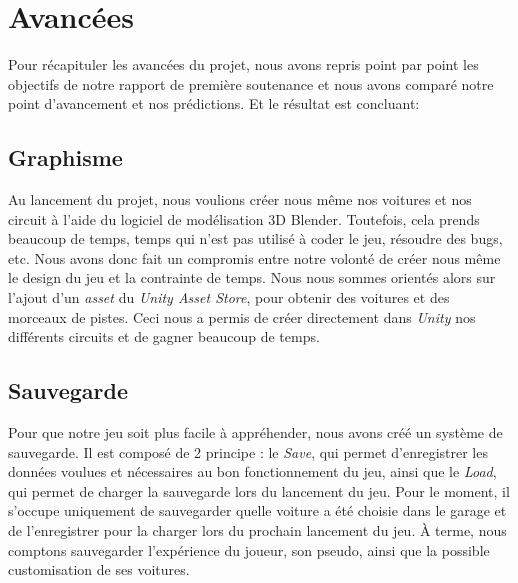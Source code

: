 \documentclass[12pt,a4paper]{article}
\begin{document}
    \section{Avancées}
        Pour récapituler les avancées du projet, nous avons repris point par point les objectifs de 
        notre rapport de première soutenance et nous avons comparé notre point d'avancement et nos 
        prédictions. Et le résultat est concluant:

        \subsection{Graphisme}
            Au lancement du projet, nous voulions créer nous même nos voitures et nos circuit à 
            l'aide du logiciel de modélisation 3D Blender. Toutefois, cela prends beaucoup de temps,
            temps qui n'est pas utilisé à coder le jeu, résoudre des bugs, etc. Nous avons donc fait
            un compromis entre notre volonté de créer nous même le design du jeu et la contrainte de
            temps. Nous nous sommes orientés alors sur l'ajout d'un \textit{asset} du \textsl{Unity
            Asset Store}, pour obtenir des voitures et des morceaux de pistes. Ceci nous a permis de
            créer directement dans \textsl{Unity} nos différents circuits et de gagner beaucoup de 
            temps. 
        
        \subsection{Sauvegarde}
            Pour que notre jeu soit plus facile à appréhender, nous avons créé un système de 
            sauvegarde. Il est composé de 2 principe : le \textsl{Save}, qui permet d'enregistrer 
            les données voulues et nécessaires au bon fonctionnement du jeu, ainsi que le 
            \textsl{Load}, qui permet de charger la sauvegarde lors du lancement du jeu. Pour le 
            moment, il s'occupe uniquement de sauvegarder quelle voiture a été choisie dans le 
            garage et de l'enregistrer pour la charger lors du prochain lancement du jeu. À terme, 
            nous comptons sauvegarder l'expérience du joueur, son pseudo, ainsi que la possible 
            customisation de ses voitures.
\end{document}
